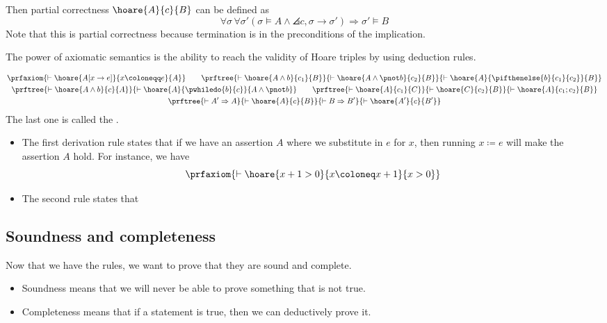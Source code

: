 \documentclass[class=scrartcl]{standalone}
\begin{document}
Then partial correctness \(\hoare{A}{c}{B}\) can be defined as
\[
  \forall \sigma \, \forall \sigma'
    (\sigma \vDash A \land \angles{c, \sigma} \to \sigma') \Rightarrow
    \sigma' \vDash B
\]
Note that this is partial correctness because
termination is in the preconditions of the implication.

The power of axiomatic semantics is the ability to reach the validity
of Hoare triples by using deduction rules.

\begin{gather*}
  \prfaxiom{\vdash \hoare{A[x \to e]}{x \coloneqq e}{A}} \qquad
  \prftree{\vdash \hoare{A \land b}{c_1}{B}}
          {\vdash \hoare{A \land \pnot b}{c_2}{B}}
          {\vdash \hoare{A}{\pifthenelse{b}{c_1}{c_2}}{B}} \\
  \prftree{\vdash \hoare{A \land b}{c}{A}}
          {\vdash \hoare{A}{\pwhiledo{b}{c}}{A \land \pnot b}} \qquad
  \prftree{\vdash \hoare{A}{c_1}{C}}
          {\vdash \hoare{C}{c_2}{B}}
          {\vdash \hoare{A}{c_1; c_2}{B}} \\
  \prftree{\vdash A' \Rightarrow A}
          {\vdash \hoare{A}{c}{B}}
          {\vdash B \Rightarrow B'}
          {\vdash \hoare{A'}{c}{B'}}
\end{gather*}
The last one is called the .
\begin{itemize}
  \item The first derivation rule states that if
        we have an assertion \(A\) where we substitute in \(e\) for \(x\),
        then running \(x \coloneqq e\) will make the assertion \(A\) hold.
        For instance, we have
        \[
          \prfaxiom{\vdash \hoare{x + 1 > 0}{x \coloneq x + 1}{x > 0}}
        \]
  \item The second rule states that
\end{itemize}


\subsection{Soundness and completeness}
Now that we have the rules, we want to prove that they are sound and complete.
\begin{itemize}[nosep]
  \item Soundness means that we will never be able to prove
        something that is not true.
  \item Completeness means that if a statement is true,
        then we can deductively prove it.

\end{itemize}
\end{document}
